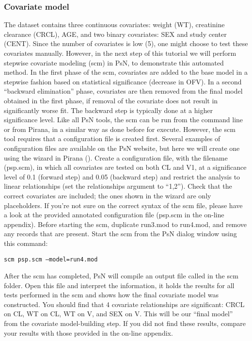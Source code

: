 \subsubsection{Covariate model}
The dataset  contains three continuous covariates: weight (WT),
creatinine clearance (CRCL), AGE, and two binary covariates: SEX and
study center (CENT). Since the number of covariates is low (5), one
might choose to test these covariates manually. However, in the next
step of this tutorial we will perform stepwise covariate modeling
(scm) in PsN, to demonstrate this automated method. In the first phase
of the scm, covariates are added to the base model in a stepwise
fashion based on statistical significance (decrease in OFV). In a
second “backward elimination” phase, covariates are then removed from
the final model obtained in the first phase, if removal of the
covariate does not result in significantly worse fit. The backward
step is typically done at a higher significance level. Like all PsN
tools, the scm can be run from the command line or from Pirana, in a
similar way as done before for execute. However, the scm tool requires
that a configuration file is created first. Several examples of
configuration files are available on the PsN website, but here we will
create one using the wizard in Pirana ().  Create a configuration file,
with the filename \fname(psp.scm), in which all covariates are tested on both
CL and V1, at a significance level of 0.1 (forward step) and 0.05
(backward step) and restrict the analysis to linear relationships (set
the relationships argument to “1,2”). Check that the correct
covariates are included; the ones shown in the wizard are only
placeholders. If you’re not sure on the correct syntax of the scm
file, please have a look at the provided annotated configuration file
(psp.scm in the on-line appendix). Before starting the scm, duplicate
run3.mod to run4.mod, and remove any  records that are
present. Start the scm from the PsN dialog window using this command:

\begin{lstlisting}
scm psp.scm –model=run4.mod
\end{lstlisting}

\noindent After the scm has completed, PsN will compile an output file
called  in the scm folder. Open this file and interpret the
information, it holds the results for all tests performed in the scm
and shows how the final covariate model was constructed. You should
find that 4 covariate relationships are significant: CRCL on CL, WT on
CL, WT on V, and SEX on V. This will be our “final model” from the
covariate model-building step. If you did not find these results,
compare your results with those provided in the on-line
appendix.

